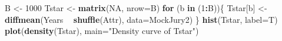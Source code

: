 \documentclass[]{book}
\newenvironment{Shaded}{\begin{snugshade}}{\end{snugshade}}
\newcommand{\KeywordTok}[1]{\textcolor[rgb]{0.13,0.29,0.53}{\textbf{#1}}}
\newcommand{\DataTypeTok}[1]{\textcolor[rgb]{0.13,0.29,0.53}{#1}}
\newcommand{\DecValTok}[1]{\textcolor[rgb]{0.00,0.00,0.81}{#1}}
\newcommand{\StringTok}[1]{\textcolor[rgb]{0.31,0.60,0.02}{#1}}
\newcommand{\OtherTok}[1]{\textcolor[rgb]{0.56,0.35,0.01}{#1}}
\newcommand{\ControlFlowTok}[1]{\textcolor[rgb]{0.13,0.29,0.53}{\textbf{#1}}}
\newcommand{\OperatorTok}[1]{\textcolor[rgb]{0.81,0.36,0.00}{\textbf{#1}}}
\newcommand{\NormalTok}[1]{#1}
\begin{document}
\begin{Shaded}
\begin{Highlighting}[]
\NormalTok{B <-}\StringTok{ }\DecValTok{1000}
\NormalTok{Tstar <-}\StringTok{ }\KeywordTok{matrix}\NormalTok{(}\OtherTok{NA}\NormalTok{, }\DataTypeTok{nrow=}\NormalTok{B)}
\ControlFlowTok{for}\NormalTok{ (b }\ControlFlowTok{in}\NormalTok{ (}\DecValTok{1}\OperatorTok{:}\NormalTok{B))\{}
\NormalTok{  Tstar[b] <-}\StringTok{ }\KeywordTok{diffmean}\NormalTok{(Years }\OperatorTok{~}\StringTok{ }\KeywordTok{shuffle}\NormalTok{(Attr), }\DataTypeTok{data=}\NormalTok{MockJury2)}
\NormalTok{\}}
\KeywordTok{hist}\NormalTok{(Tstar, }\DataTypeTok{label=}\NormalTok{T)}
\KeywordTok{plot}\NormalTok{(}\KeywordTok{density}\NormalTok{(Tstar), }\DataTypeTok{main=}\StringTok{"Density curve of Tstar"}\NormalTok{)}
\end{Highlighting}
\end{Shaded}
\end{document}
